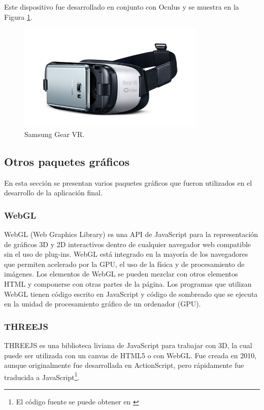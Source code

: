 \documentclass[12pt]{article}
\begin{document}
Este dispositivo fue desarrollado en conjunto con Oculus\cite{samsungvr} y se muestra en la Figura \ref{sgvr}.
\begin{figure}[h!]
\includegraphics[width=0.8\textwidth,center]{samsungvr.png}
\caption{Samsung Gear VR.}
\label{sgvr}
\end{figure}

\subsection{Otros paquetes gráficos}
En esta sección se presentan varios paquetes gráficos que fueron utilizados en el desarrollo de la aplicación final.
\subsubsection{WebGL}
WebGL (Web Graphics Library) es una API de JavaScript para la representación  de gráficos 3D y 2D  interactivos dentro de cualquier navegador web compatible sin el uso de plug-ins. WebGL está integrado en la mayoría de los navegadores que permiten acelerado por la GPU, el uso de la física y de procesamiento de imágenes. Los elementos de WebGL se pueden mezclar con otros elementos HTML y componerse con otras partes de la página. Los programas que utilizan WebGL tienen código escrito en JavaScript y  código de sombreado que se ejecuta en la unidad de procesamiento gráfico de un ordenador (GPU). 
\subsubsection{THREEJS}

THREEJS es una biblioteca liviana\cite{three} de JavaScript para trabajar con 3D, la cual puede ser utilizada con un canvas de HTML5 o con WebGL. Fue creada en 2010, aunque originalmente fue desarrollada en ActionScript, pero rápidamente fue traducida a JavaScript\footnote{El código fuente se puede obtener en \cite{codigothree}}.
\end{document}

